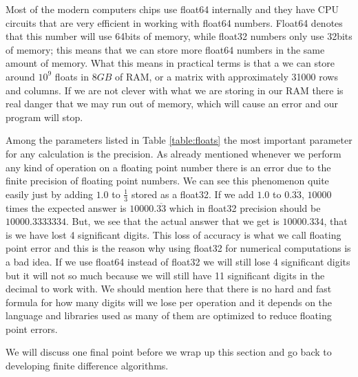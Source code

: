 Most of the modern computers chips use float64 internally and they have CPU circuits that are very efficient in working with float64 numbers. Float64 denotes that this number will use 64bits of memory, while float32 numbers only use 32bits of memory; this means that we can store more float64 numbers in the same amount of memory. What this means in practical terms is that a we can store around $10^9$ floats in $8GB$ of RAM, or a matrix with approximately 31000 rows and columns. If we are not clever with what we are storing in our RAM there is real danger that we may run out of memory, which will cause an error and our program will stop.


Among the parameters listed in Table \ref{table:floats} the most important parameter for any calculation is the precision. As already mentioned whenever we perform any kind of operation on a floating point number there is an error due to the finite precision of floating point numbers.
We can see this phenomenon quite easily just by adding $1.0$ to $\frac{1}{3}$ stored as a float32. If we add $1.0$ to $0.\overline{33}$, $10000$ times the expected answer is $10000.\overline{33}$ which in float32 precision should be $10000.3333334$. But, we see that the actual answer that we get is $10000.334$, that is we have lost 4 significant digits.
This loss of accuracy is what we call floating point error and this is the reason why using float32 for numerical computations is a bad idea. If we use float64 instead of float32 we will still lose 4 significant digits but it will not so much because we will still have 11 significant digits in the decimal to work with. We should mention here that there is no hard and fast formula for how many digits will we lose per operation and it depends on the language and libraries used as many of them are optimized to reduce floating point errors.


We will discuss one final point before we wrap up this section and go back to developing finite difference algorithms.





